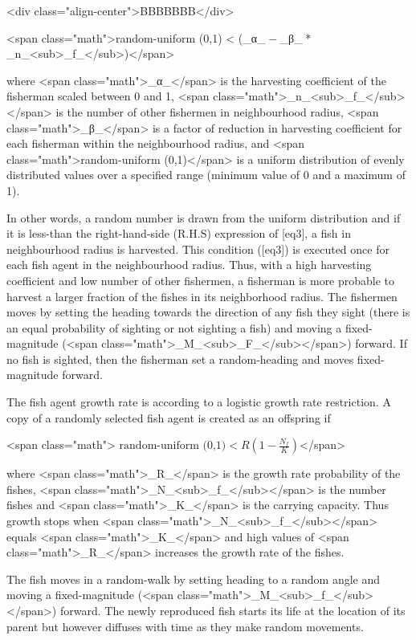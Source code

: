  <div class="align-center">BBBBBBB</div>

<span class="math">random-uniform (0,1) < (_α_ − _β_ * _n_<sub>_f_</sub>)</span>

where <span class="math">_α_</span> is the harvesting coefficient of the fisherman scaled between 0 and 1, <span class="math">_n_<sub>_f_</sub></span> is the number of other fishermen in neighbourhood radius, <span class="math">_β_</span> is a factor of reduction in harvesting coefficient for each fisherman within the neighbourhood radius, and <span class="math">random-uniform (0,1)</span> is a uniform distribution of evenly distributed values over a specified range (minimum value of 0 and a maximum of 1).

In other words, a random number is drawn from the uniform distribution and if it is less-than the right-hand-side (R.H.S) expression of [eq3], a fish in neighbourhood radius is harvested. This condition ([eq3]) is executed once for each fish agent in the neighbourhood radius. Thus, with a high harvesting coefficient and low number of other fishermen, a fisherman is more probable to harvest a larger fraction of the fishes in its neighborhood radius. The fishermen moves by setting the heading towards the direction of any fish they sight (there is an equal probability of sighting or not sighting a fish) and moving a fixed-magnitude (<span class="math">_M_<sub>_F_</sub></span>) forward. If no fish is sighted, then the fisherman set a random-heading and moves fixed-magnitude forward.

The fish agent growth rate is according to a logistic growth rate restriction. A copy of a randomly selected fish agent is created as an offspring if

<span class="math">$\mbox{ random-uniform (0,1)} < R \left(1- \frac{N_{f}}{K}\right) \label{eq4}$</span>

where <span class="math">_R_</span> is the growth rate probability of the fishes, <span class="math">_N_<sub>_f_</sub></span> is the number fishes and <span class="math">_K_</span> is the carrying capacity. Thus growth stops when <span class="math">_N_<sub>_f_</sub></span> equals <span class="math">_K_</span> and high values of <span class="math">_R_</span> increases the growth rate of the fishes.

The fish moves in a random-walk by setting heading to a random angle and moving a fixed-magnitude (<span class="math">_M_<sub>_f_</sub></span>) forward. The newly reproduced fish starts its life at the location of its parent but however diffuses with time as they make random movements.



